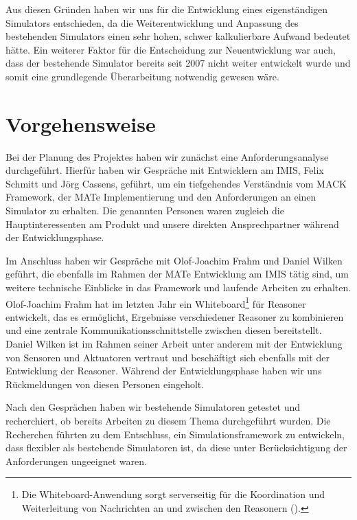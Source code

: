 Aus diesen Gründen haben wir uns für die Entwicklung eines eigenständigen Simulators entschieden, da die Weiterentwicklung und Anpassung des bestehenden Simulators einen sehr hohen, schwer kalkulierbare Aufwand bedeutet hätte. Ein weiterer Faktor für die Entscheidung zur Neuentwicklung war auch, dass der bestehende Simulator bereits seit 2007 nicht weiter entwickelt wurde und somit eine grundlegende Überarbeitung notwendig gewesen wäre.



\section{Vorgehensweise}\label{sec:approach}
Bei der Planung des Projektes haben wir zunächst eine Anforderungsanalyse durchgeführt. Hierfür haben wir Gespräche mit Entwicklern am IMIS, Felix Schmitt und Jörg Cassens, geführt, um ein tiefgehendes Verständnis vom MACK Framework, der MATe Implementierung und den Anforderungen an einen Simulator zu erhalten. Die genannten Personen waren zugleich die Hauptinteressenten am Produkt und unsere direkten Ansprechpartner während der Entwicklungsphase.

Im Anschluss haben wir Gespräche mit Olof-Joachim Frahm und Daniel Wilken geführt, die ebenfalls im Rahmen der MATe Entwicklung am IMIS tätig sind, um weitere technische Einblicke in das Framework und laufende Arbeiten zu erhalten. Olof-Joachim Frahm hat im letzten Jahr ein Whiteboard\footnote{Die Whiteboard-Anwendung sorgt serverseitig für die Koordination und Weiterleitung von Nachrichten an und zwischen den Reasonern (\cite{frahmo}).} für Reasoner entwickelt, das es ermöglicht, Ergebnisse verschiedener Reasoner zu kombinieren und eine zentrale Kommunikationsschnittstelle zwischen diesen bereitstellt. Daniel Wilken ist im Rahmen seiner Arbeit unter anderem mit der Entwicklung von Sensoren und Aktuatoren vertraut und beschäftigt sich ebenfalls mit der Entwicklung der Reasoner. Während der Entwicklungsphase haben wir uns Rückmeldungen von diesen Personen eingeholt.

Nach den Gesprächen haben wir bestehende Simulatoren getestet und recherchiert, ob bereits Arbeiten zu diesem Thema durchgeführt wurden. Die Recherchen führten zu dem Entschluss, ein Simulationsframework zu entwickeln, dass flexibler als bestehende Simulatoren ist, da diese unter Berücksichtigung der Anforderungen ungeeignet waren.

